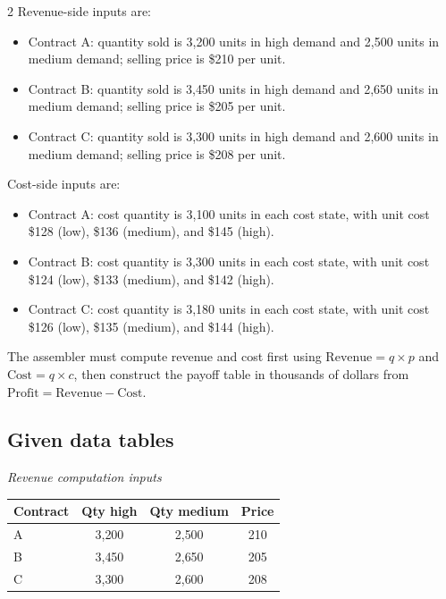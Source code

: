 \documentclass[12pt]{article}
\begin{document}
\begin{multicols}{2}
				Revenue-side inputs are:
				\begin{itemize}
					\item Contract A: quantity sold is 3{,}200 units in high demand and 2{,}500 units in medium demand; selling price is \$210 per unit.
					\item Contract B: quantity sold is 3{,}450 units in high demand and 2{,}650 units in medium demand; selling price is \$205 per unit.
					\item Contract C: quantity sold is 3{,}300 units in high demand and 2{,}600 units in medium demand; selling price is \$208 per unit.
				\end{itemize}
				Cost-side inputs are:
				\begin{itemize}
					\item Contract A: cost quantity is 3{,}100 units in each cost state, with unit cost \$128 (low), \$136 (medium), and \$145 (high).
					\item Contract B: cost quantity is 3{,}300 units in each cost state, with unit cost \$124 (low), \$133 (medium), and \$142 (high).
					\item Contract C: cost quantity is 3{,}180 units in each cost state, with unit cost \$126 (low), \$135 (medium), and \$144 (high).
				\end{itemize}
				
				The assembler must compute revenue and cost first using
				\(\text{Revenue}=q\times p\) and \(\text{Cost}=q\times c\), then construct the payoff table in thousands of dollars from
				\(\text{Profit}=\text{Revenue}-\text{Cost}\).
				\subsection*{Given data tables}
				\begin{center}
					\textit{Revenue computation inputs}
					\begin{center}
						\begin{tabular}{l c c c}
							\toprule
							Contract & Qty high & Qty medium & Price \\
							\midrule
							A & 3{,}200 & 2{,}500 & 210 \\
							B & 3{,}450 & 2{,}650 & 205 \\
							C & 3{,}300 & 2{,}600 & 208 \\
							\bottomrule
						\end{tabular}
					\end{center}
					

\end{center}
\end{multicols}
\end{document}
